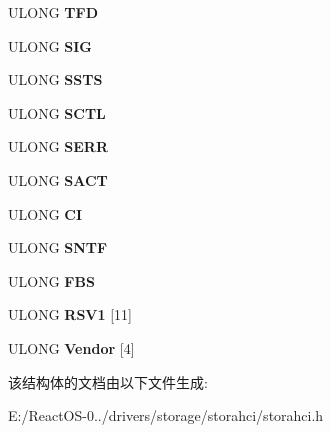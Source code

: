 \begin{DoxyCompactItemize}
U\+L\+O\+NG {\bfseries T\+FD}
\item 
\mbox{\label{struct___a_h_c_i___p_o_r_t_ad194ccc9ff780c946f5874e6aa9f064b}} 
U\+L\+O\+NG {\bfseries S\+IG}
\item 
\mbox{\label{struct___a_h_c_i___p_o_r_t_a9d3602e0284bed2781ca577e10c16316}} 
U\+L\+O\+NG {\bfseries S\+S\+TS}
\item 
\mbox{\label{struct___a_h_c_i___p_o_r_t_a1dd331ef5d8add3f4ded029eb0d56e92}} 
U\+L\+O\+NG {\bfseries S\+C\+TL}
\item 
\mbox{\label{struct___a_h_c_i___p_o_r_t_af2715cd826307404cc87e3d0a9f85ec4}} 
U\+L\+O\+NG {\bfseries S\+E\+RR}
\item 
\mbox{\label{struct___a_h_c_i___p_o_r_t_ad94bff4137af9292a44c8540b530ea96}} 
U\+L\+O\+NG {\bfseries S\+A\+CT}
\item 
\mbox{\label{struct___a_h_c_i___p_o_r_t_a64ec41fb1a621e03a796560b3da1c17e}} 
U\+L\+O\+NG {\bfseries CI}
\item 
\mbox{\label{struct___a_h_c_i___p_o_r_t_accb07d9e75cc99f4125a7cc907811ba2}} 
U\+L\+O\+NG {\bfseries S\+N\+TF}
\item 
\mbox{\label{struct___a_h_c_i___p_o_r_t_a4c35417dbd79b474350f9bf4094a65bb}} 
U\+L\+O\+NG {\bfseries F\+BS}
\item 
\mbox{\label{struct___a_h_c_i___p_o_r_t_a74c7a8b99562c66ea00351308c349df3}} 
U\+L\+O\+NG {\bfseries R\+S\+V1} \mbox{[}11\mbox{]}
\item 
\mbox{\label{struct___a_h_c_i___p_o_r_t_a657cca4c0d5c91258e4bb9ee98bd63ea}} 
U\+L\+O\+NG {\bfseries Vendor} \mbox{[}4\mbox{]}
\end{DoxyCompactItemize}


该结构体的文档由以下文件生成\+:\begin{DoxyCompactItemize}
\item 
E\+:/\+React\+O\+S-\/0../drivers/storage/storahci/storahci.\+h\end{DoxyCompactItemize}
